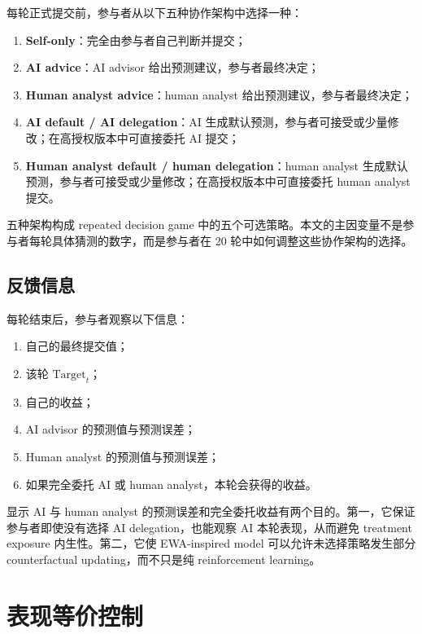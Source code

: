 \documentclass[12pt]{article}
\begin{document}
每轮正式提交前，参与者从以下五种协作架构中选择一种：
\begin{enumerate}[label=\arabic*.]
    \item \textbf{Self-only}：完全由参与者自己判断并提交；
    \item \textbf{AI advice}：AI advisor 给出预测建议，参与者最终决定；
    \item \textbf{Human analyst advice}：human analyst 给出预测建议，参与者最终决定；
    \item \textbf{AI default / AI delegation}：AI 生成默认预测，参与者可接受或少量修改；在高授权版本中可直接委托 AI 提交；
    \item \textbf{Human analyst default / human delegation}：human analyst 生成默认预测，参与者可接受或少量修改；在高授权版本中可直接委托 human analyst 提交。
\end{enumerate}

五种架构构成 repeated decision game 中的五个可选策略。本文的主因变量不是参与者每轮具体猜测的数字，而是参与者在 20 轮中如何调整这些协作架构的选择。

\subsection{反馈信息}

每轮结束后，参与者观察以下信息：
\begin{enumerate}[label=\arabic*.]
    \item 自己的最终提交值；
    \item 该轮 $\text{Target}_t$；
    \item 自己的收益；
    \item AI advisor 的预测值与预测误差；
    \item Human analyst 的预测值与预测误差；
    \item 如果完全委托 AI 或 human analyst，本轮会获得的收益。
\end{enumerate}

显示 AI 与 human analyst 的预测误差和完全委托收益有两个目的。第一，它保证参与者即使没有选择 AI delegation，也能观察 AI 本轮表现，从而避免 treatment exposure 内生性。第二，它使 EWA-inspired model 可以允许未选择策略发生部分 counterfactual updating，而不只是纯 reinforcement learning。

\section{表现等价控制}
\end{document}
